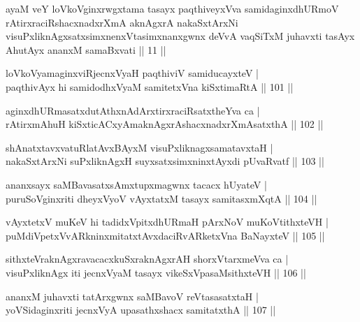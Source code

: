 

\begin{shl}
ayaM veY loVkoV\s ginxrwgxtama tasayx paqthiveyxVva samidaginxdhURmoV rAtirxraciRshacxnadxrXmA aknAgxrA nakaSxtArxNi visuPxliknAgxsatxsimxnenxVtasimxnanxgwnx deVvA vaqSiTxM juhavxti tasAyx AhutAyx ananxM samaBxvati || 11 ||
\end{shl}


\begin{shl}
loVkoV\s yamaginxviRjecnxVyaH paqthiviV samiducayxteV | \\
paqthivAyx hi samidodhxV\s yaM samitetxVna kiSxtimaRtA \hfill|| 101 || 
\end{shl}

\begin{shl}
aginxdhURmasatxdutAthxnAdArxtirxraciRsatxtheYva ca | \\
rAtirxmAhuH kiSxticACxyAmaknAgxrAshacxnadxrXmAsatxthA \hfill|| 102 || 
\end{shl}

\begin{shl}
shAnatxtavxvatuRlatAvxBAyxM visuPxliknagxsamatavxtaH | \\
nakaSxtArxNi suPxliknAgxH suyxsatxsimxninxtAyxdi pUvaRvatf \hfill|| 103 || 
\end{shl}

\begin{shl}
ananxsayx saMBavasatxsAmxtupxmagwnx tacacx hUyateV | \\
puruSoV\s ginxriti dheyxVyoV vAyxtatxM tasayx samitasxmXqtA \hfill|| 104 || 
\end{shl}

\begin{shl}
vAyxtetxV muKeV hi tadidxVpitxdhURmaH pArxNoV muKoVtithxteVH | \\
puMdiVpetxVvARkninxmitatxtAvxdaciRvARketxVna BaNayxteV \hfill|| 105 || 
\end{shl}

\begin{shl}
sithxteVraknAgxravacacxkuSxraknAgxrAH shorxVtarxmeVva ca | \\
visuPxliknAgx iti jecnxVyaM tasayx vikeSxVpasaMsithxteVH \hfill|| 106 || 
\end{shl}

\begin{shl}
ananxM juhavxti tatArxgwnx saMBavoV reVtasasatxtaH | \\
yoVSidaginxriti jecnxVyA upasathxshacx samitatxthA \hfill|| 107 || 
\end{shl}

